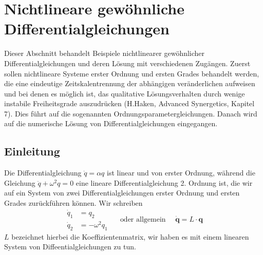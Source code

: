 \chapter{Nichtlineare gewöhnliche Differentialgleichungen}
Dieser Abschnitt behandelt Beispiele nichtlinearer gewöhnlicher
Differentialgleichungen und deren Lösung mit verschiedenen Zugängen. Zuerst
sollen nichtlineare Systeme erster Ordnung und ersten Grades behandelt werden,
die eine eindeutige Zeitskalentrennung der abhängigen veränderlichen aufweisen
und bei denen es möglich ist, das qualitative Lösungsverhalten durch wenige
instabile Freiheitsgrade auszudrücken ({\red H.Haken, Advanced Synergetics,
Kapitel 7}). Dies führt auf die sogenannten Ordnungsparametergleichungen.
Danach wird auf die numerische Lösung von Differentialgleichungen eingegangen.
\section{Einleitung}
Die Differentialgleichung $\dot q=\alpha q$ ist linear und von erster Ordnung,
während die Gleichung $\ddot q+\omega^2 q=0$ eine lineare Differentialgleichung
2. Ordnung ist, die wir auf ein System von zwei Differentialgleichungen erster
Ordnung und ersten Grades zurückführen können. Wir schreiben
\[
  \begin{matrix}\dot q_1&=q_2\\ \dot q_2&= -\omega^2 q_1 \end{matrix} 
  \quad\text{ oder allgemein }\quad\dot{\mathbf{q}}=L\cdot\mathbf{q}
\]
$L$ bezeichnet hierbei die Koeffizientenmatrix, wir haben es mit einem linearen
System von Diffeentialgleichungen zu tun.

